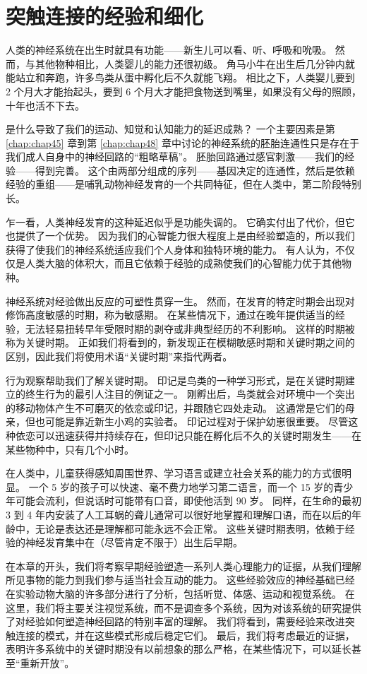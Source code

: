 \chapter{突触连接的经验和细化} \label{chap:chap49}
人类的神经系统在出生时就具有功能——新生儿可以看、听、呼吸和吮吸。
然而，与其他物种相比，人类婴儿的能力还很初级。
角马小牛在出生后几分钟内就能站立和奔跑，许多鸟类从蛋中孵化后不久就能飞翔。
相比之下，人类婴儿要到 2 个月大才能抬起头，要到 6 个月大才能把食物送到嘴里，如果没有父母的照顾，十年也活不下去。


是什么导致了我们的运动、知觉和认知能力的延迟成熟？
一个主要因素是第 \ref{chap:chap45} 章到第 \ref{chap:chap48} 章中讨论的神经系统的胚胎连通性只是存在于我们成人自身中的神经回路的“粗略草稿”。 胚胎回路通过感官刺激——我们的经验——得到完善。
这个由两部分组成的序列——基因决定的连通性，然后是依赖经验的重组——是哺乳动物神经发育的一个共同特征，但在人类中，第二阶段特别长。


乍一看，人类神经发育的这种延迟似乎是功能失调的。
它确实付出了代价，但它也提供了一个优势。
因为我们的心智能力很大程度上是由经验塑造的，所以我们获得了使我们的神经系统适应我们个人身体和独特环境的能力。
有人认为，不仅仅是人类大脑的体积大，而且它依赖于经验的成熟使我们的心智能力优于其他物种。


神经系统对经验做出反应的可塑性贯穿一生。
然而，在发育的特定时期会出现对修饰高度敏感的时期，称为敏感期。
在某些情况下，通过在晚年提供适当的经验，无法轻易扭转早年受限时期的剥夺或非典型经历的不利影响。
这样的时期被称为关键时期。
正如我们将看到的，新发现正在模糊敏感时期和关键时期之间的区别，因此我们将使用术语“关键时期”来指代两者。


行为观察帮助我们了解关键时期。
印记是鸟类的一种学习形式，是在关键时期建立的终生行为的最引人注目的例证之一。
刚孵出后，鸟类就会对环境中一个突出的移动物体产生不可磨灭的依恋或印记，并跟随它四处走动。
这通常是它们的母亲，但也可能是靠近新生小鸡的实验者。 印记过程对于保护幼崽很重要。
尽管这种依恋可以迅速获得并持续存在，但印记只能在孵化后不久的关键时期发生——在某些物种中，只有几个小时。


在人类中，儿童获得感知周围世界、学习语言或建立社会关系的能力的方式很明显。
一个 5 岁的孩子可以快速、毫不费力地学习第二语言，而一个 15 岁的青少年可能会流利，但说话时可能带有口音，即使他活到 90 岁。
同样，在生命的最初 3 到 4 年内安装了人工耳蜗的聋儿通常可以很好地掌握和理解口语，而在以后的年龄中，无论是表达还是理解都可能永远不会正常。
这些关键时期表明，依赖于经验的神经发育集中在（尽管肯定不限于）出生后早期。


在本章的开头，我们将考察早期经验塑造一系列人类心理能力的证据，从我们理解所见事物的能力到我们参与适当社会互动的能力。
这些经验效应的神经基础已经在实验动物大脑的许多部分进行了分析，包括听觉、体感、运动和视觉系统。
在这里，我们将主要关注视觉系统，而不是调查多个系统，因为对该系统的研究提供了对经验如何塑造神经回路的特别丰富的理解。
我们将看到，需要经验来改进突触连接的模式，并在这些模式形成后稳定它们。
最后，我们将考虑最近的证据，表明许多系统中的关键时期没有以前想象的那么严格，在某些情况下，可以延长甚至“重新开放”。


